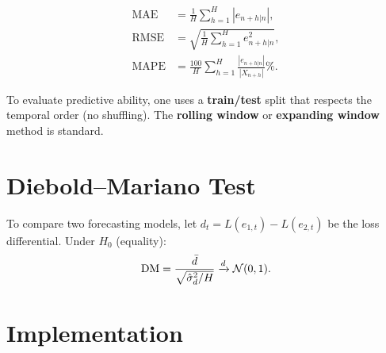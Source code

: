 \begin{definition}
\begin{align}
\text{MAE} &= \frac{1}{H}\sum_{h=1}^H|e_{n+h|n}|, \\
\text{RMSE} &= \sqrt{\frac{1}{H}\sum_{h=1}^H e_{n+h|n}^2}, \\
\text{MAPE} &= \frac{100}{H}\sum_{h=1}^H\frac{|e_{n+h|n}|}{|X_{n+h}|}\%.
\end{align}
\end{definition}

\begin{definition}
To evaluate predictive ability, one uses a \textbf{train/test} split that respects the temporal order (no shuffling). The \textbf{rolling window} or \textbf{expanding window} method is standard.
\end{definition}

\section{Diebold--Mariano Test}

\begin{definition}
To compare two forecasting models, let $d_t = L(e_{1,t})-L(e_{2,t})$ be the loss differential. Under $H_0$ (equality):
\[
\text{DM} = \frac{\bar{d}}{\sqrt{\hat\sigma_d^2/H}} \xrightarrow{d} \mathcal{N}(0,1).
\]
\end{definition}

\section{Implementation}

